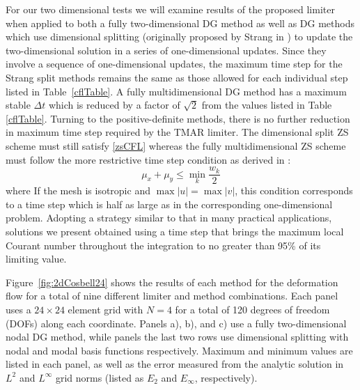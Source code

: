 \documentclass{ametsoc}
\begin{document}
For our two dimensional tests we will examine results of the proposed limiter when applied to both a fully two-dimensional DG method as well as DG methods which use dimensional splitting (originally proposed by Strang in \cite{strang68}) to update the two-dimensional solution in a series of one-dimensional updates. Since they involve a sequence of one-dimensional updates, the maximum time step for the Strang split methods remains the same as those allowed for each individual step listed in Table~\ref{cflTable}. A fully multidimensional DG method has a maximum stable $\Delta t$ which is reduced by a factor of $\sqrt{2}$ from the values listed in Table \ref{cflTable}. Turning to the positive-definite methods, there is no further reduction in maximum time step required by the TMAR limiter. The dimensional split ZS scheme must still satisfy \eqref{zsCFL} whereas the fully multidimensional ZS scheme must follow the more restrictive time step condition as derived in \cite{Zhang2010}: 
\begin{equation}
\mu_x + \mu_y \leq \min \limits_{k} \frac{w_k}{2}
\label{eqn:2dZScfl}
\end{equation}
where 
If the mesh is isotropic and $\max |u| = \max |v|$, this condition corresponds to a time step which is half as large as in the corresponding one-dimensional problem. Adopting a strategy similar to that in many practical applications, solutions we present obtained using a time step that brings the maximum local Courant number throughout the integration to no greater than 95\% of its limiting value.

Figure~\ref{fig:2dCosbell24} shows the results of each method for the deformation flow for a total of nine different limiter and method combinations. Each panel uses a $24 \times 24$ element grid with $N=4$ for a total of 120 degrees of freedom (DOFs) along each coordinate. Panels a), b), and c) use a fully two-dimensional nodal DG method, while panels the last two rows use dimensional splitting with nodal and modal basis functions respectively. Maximum and minimum values are listed in each panel, as well as the error measured from the analytic solution in $L^2$ and $L^{\infty}$ grid norms (listed as $E_2$ and $E_{\infty}$, respectively).
\end{document}
